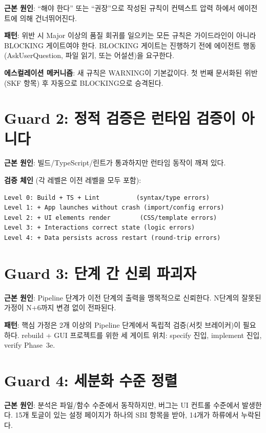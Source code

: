 \documentclass[11pt,a4paper,openright,twoside]{report}
\begin{document}
\textbf{근본 원인}: ``해야 한다'' 또는 ``권장''으로 작성된 규칙이 컨텍스트 압력 하에서 에이전트에 의해 건너뛰어진다.

\textbf{패턴}: 위반 시 Major 이상의 품질 회귀를 일으키는 모든 규칙은 가이드라인이 아니라 BLOCKING 게이트여야 한다. BLOCKING 게이트는 진행하기 전에 에이전트 행동(AskUserQuestion, 파일 읽기, 또는 어설션)을 요구한다.

\textbf{에스컬레이션 메커니즘}: 새 규칙은 WARNING이 기본값이다. 첫 번째 문서화된 위반(SKF 항목) 후 자동으로 BLOCKING으로 승격된다.

\section{Guard 2: 정적 검증은 런타임 검증이 아니다}

\textbf{근본 원인}: 빌드/TypeScript/린트가 통과하지만 런타임 동작이 깨져 있다.

\textbf{검증 체인} (각 레벨은 이전 레벨을 모두 포함):

\begin{lstlisting}[title={Verification Levels}]
Level 0: Build + TS + Lint          (syntax/type errors)
Level 1: + App launches without crash (import/config errors)
Level 2: + UI elements render        (CSS/template errors)
Level 3: + Interactions correct state (logic errors)
Level 4: + Data persists across restart (round-trip errors)
\end{lstlisting}

\section{Guard 3: 단계 간 신뢰 파괴자}

\textbf{근본 원인}: Pipeline 단계가 이전 단계의 출력을 맹목적으로 신뢰한다. N단계의 잘못된 가정이 N+6까지 변경 없이 전파된다.

\textbf{패턴}: 핵심 가정은 2개 이상의 Pipeline 단계에서 독립적 검증(서킷 브레이커)이 필요하다. rebuild + GUI 프로젝트를 위한 세 게이트 위치: specify 진입, implement 진입, verify Phase~3e.

\section{Guard 4: 세분화 수준 정렬}

\textbf{근본 원인}: 분석은 파일/함수 수준에서 동작하지만, 버그는 UI 컨트롤 수준에서 발생한다. 15개 토글이 있는 설정 페이지가 하나의 SBI 항목을 받아, 14개가 하류에서 누락된다.
\end{document}
